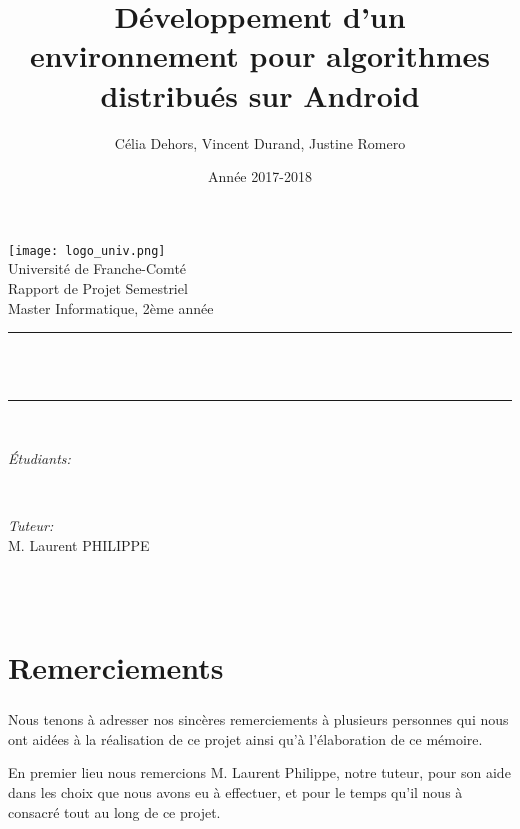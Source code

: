 \documentclass[a4paper,10pt]{report}
\title{Développement d'un environnement pour algorithmes distribués sur Android}
\author{Célia Dehors, Vincent Durand, Justine Romero}
\date{Année 2017-2018}
\makeatletter
\let\thetitle\@title
\let\theauthor\@author
\let\thedate\@date
\makeatother
\begin{document}
  
  \begin{titlepage}
    \centering
    \vspace*{0.5 cm}
    \texttt{[image: logo\_univ.png]}\\[1.0 cm]   %
    \LARGE Université de Franche-Comté\\[2.0 cm]   %
    \Large Rapport de Projet Semestriel\\               %
    \large Master Informatique, 2ème année\\[2.5 cm]               %
    \rule{\linewidth}{0.2 mm} \\[2.5 mm]
    { \huge \bfseries \thetitle}\\
    \rule{\linewidth}{0.2 mm} \\[2.0 cm]
    
    \begin{minipage}{0.6\textwidth}
        \begin{flushleft} \large
            \emph{Étudiants:}\\
            \theauthor
        \end{flushleft}
    \end{minipage}~
    \begin{minipage}{0.4\textwidth}
        \begin{flushleft} \large
            \emph{Tuteur:}\\
            M. Laurent PHILIPPE
        \end{flushleft}
    \end{minipage}\\[3.0 cm]
    {\large \thedate}\\[2 cm]
    \vfill
    
\end{titlepage}
\chapter*{Remerciements}
\paragraph{}
Nous tenons à adresser nos sincères remerciements à plusieurs personnes qui nous ont aidées à la réalisation de ce projet ainsi qu'à l'élaboration de ce mémoire.

En premier lieu nous remercions M. Laurent Philippe, notre tuteur, pour son aide dans les choix que nous avons eu à effectuer, et pour le temps qu'il nous à consacré tout au long de ce projet.
\end{document}
